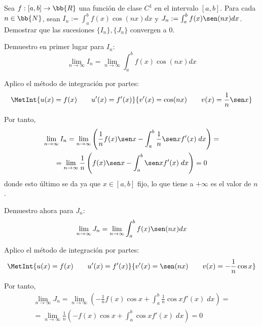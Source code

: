 \begin{ejercicio}
    Sea $f:[a,b]\to \bb{R}$ una función de clase $C^1$ en el intervalo $[a,b]$. Para cada $n\in \bb{N}$, sean $I_n:=\int_a^bf(x)\cos(nx)dx$ y $J_n:=\int_a^bf(x)\sen(nx)dx$. Demostrar que las sucesiones $\{I_n\}, \{J_n\}$ convergen a 0.

    Demuestro en primer lugar para $I_n$:
    \begin{equation*}
        \lim_{n\to \infty} I_n = \lim_{n\to \infty} \int_a^bf(x)\cos(nx)dx
    \end{equation*}

    Aplico el método de integración por partes:
    \begin{equation*}
        \MetInt{u(x)=f(x) \qquad u'(x)=f'(x)}{v'(x)=\cos(nx) \qquad v(x)=\frac{1}{n}\sen x}
    \end{equation*}

    Por tanto,
    \begin{multline*}
         \lim_{n\to \infty} I_n =  \lim_{n\to \infty} \left(\frac{1}{n}f(x)\sen x -\int_a^b \frac{1}{n}\sen x f'(x)\;dx\right)
         =\\= \lim_{n\to \infty} \frac{1}{n} \left(f(x)\sen x -\int_a^b \sen x f'(x)\;dx\right) = 0
    \end{multline*}
    donde esto último se da ya que $x\in [a,b]$ fijo, lo que tiene a $+\infty$ es el valor de $n$.


    \vspace{1cm}Demuestro ahora para $J_n$:
    \begin{equation*}
        \lim_{n\to \infty} J_n = \lim_{n\to \infty} \int_a^bf(x)\sen(nx)dx
    \end{equation*}

    Aplico el método de integración por partes:
    \begin{equation*}
        \MetInt{u(x)=f(x) \qquad u'(x)=f'(x)}{v'(x)=\sen(nx) \qquad v(x)=-\frac{1}{n}\cos x}
    \end{equation*}

    Por tanto,
    \begin{multline*}
         \lim_{n\to \infty} J_n =  \lim_{n\to \infty} \left(-\frac{1}{n}f(x)\cos x +\int_a^b \frac{1}{n}\cos x f'(x)\;dx\right)
         =\\= \lim_{n\to \infty} \frac{1}{n} \left(-f(x)\cos x +\int_a^b \cos x f'(x)\;dx\right) = 0
    \end{multline*}
\end{ejercicio}

